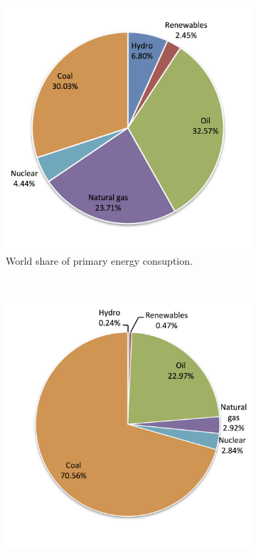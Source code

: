 \begin{figure}[!b]
        \centering                
        \begin{subfigure}[b]{0.45\textwidth}
                \centering
                \includegraphics[width=1\textwidth]{FIG/PrimWorld}
                \caption{World share of primary energy consuption.}\label{PrimWorld}
        \end{subfigure}
        ~
        \begin{subfigure}[b]{0.45\textwidth}
                \centering
                \includegraphics[width=1\textwidth]{FIG/PrimSA}

\end{subfigure}
\end{figure}
